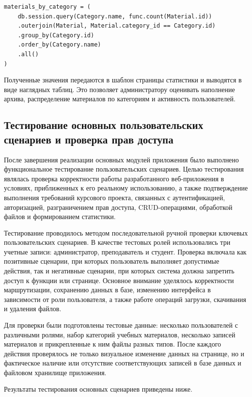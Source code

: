\begin{lstlisting}
materials_by_category = (
    db.session.query(Category.name, func.count(Material.id))
    .outerjoin(Material, Material.category_id == Category.id)
    .group_by(Category.id)
    .order_by(Category.name)
    .all()
)
\end{lstlisting}

Полученные значения передаются в шаблон страницы статистики и выводятся в виде наглядных таблиц. Это позволяет администратору оценивать наполнение архива, распределение материалов по категориям и активность пользователей.

\subsection{Тестирование основных пользовательских сценариев и проверка прав доступа}

После завершения реализации основных модулей приложения было выполнено функциональное тестирование пользовательских сценариев. Целью тестирования являлась проверка корректности работы разработанного веб-приложения в условиях, приближенных к его реальному использованию, а также подтверждение выполнения требований курсового проекта, связанных с аутентификацией, авторизацией, разграничением прав доступа, CRUD-операциями, обработкой файлов и формированием статистики.

Тестирование проводилось методом последовательной ручной проверки ключевых пользовательских сценариев. В качестве тестовых ролей использовались три учетные записи: администратор, преподаватель и студент. Проверка включала как позитивные сценарии, при которых пользователь выполняет допустимые действия, так и негативные сценарии, при которых система должна запретить доступ к функции или странице. Основное внимание уделялось корректности маршрутизации, сохранению данных в базе, изменению интерфейса в зависимости от роли пользователя, а также работе операций загрузки, скачивания и удаления файлов.

Для проверки были подготовлены тестовые данные: несколько пользователей с различными ролями, набор категорий учебных материалов, несколько записей материалов и прикрепленные к ним файлы разных типов. После каждого действия проверялось не только визуальное изменение данных на странице, но и фактическое наличие или отсутствие соответствующих записей в базе данных и файловом хранилище приложения.

Результаты тестирования основных сценариев приведены ниже.

